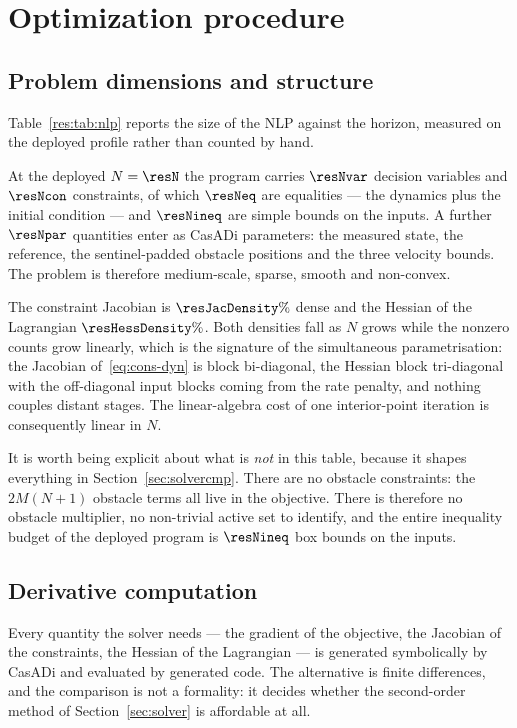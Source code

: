 \documentclass[11pt,a4paper]{article}
\begin{document}
\section{Optimization procedure}
\label{sec:optproc}

\subsection{Problem dimensions and structure}
\label{sec:dims}

Table~\ref{res:tab:nlp} reports the size of the NLP against the horizon, measured on the deployed profile
rather than counted by hand.


At the deployed $N=\resN$ the program carries $\resNvar$ decision variables and $\resNcon$ constraints, of
which $\resNeq$ are equalities --- the dynamics plus the initial condition --- and $\resNineq$ are simple
bounds on the inputs. A further $\resNpar$ quantities enter as CasADi parameters: the measured state, the
reference, the sentinel-padded obstacle positions and the three velocity bounds. The problem is therefore
medium-scale, sparse, smooth and non-convex.

The constraint Jacobian is $\resJacDensity\%$ dense and the Hessian of the Lagrangian $\resHessDensity\%$.
Both densities fall as $N$ grows while the nonzero counts grow linearly, which is the signature of the
simultaneous parametrisation: the Jacobian of~\eqref{eq:cons-dyn} is block bi-diagonal, the Hessian block
tri-diagonal with the off-diagonal input blocks coming from the rate penalty, and nothing couples distant
stages. The linear-algebra cost of one interior-point iteration is consequently linear in $N$.

It is worth being explicit about what is \emph{not} in this table, because it shapes everything in
Section~\ref{sec:solvercmp}. There are no obstacle constraints: the $2M(N+1)$ obstacle terms all live in the
objective. There is therefore no obstacle multiplier, no non-trivial active set to identify, and the entire
inequality budget of the deployed program is $\resNineq$ box bounds on the inputs.

\subsection{Derivative computation}
\label{sec:deriv}

Every quantity the solver needs --- the gradient of the objective, the Jacobian of the constraints, the
Hessian of the Lagrangian --- is generated symbolically by CasADi and evaluated by generated code. The
alternative is finite differences, and the comparison is not a formality: it decides whether the second-order
method of Section~\ref{sec:solver} is affordable at all.
\end{document}
